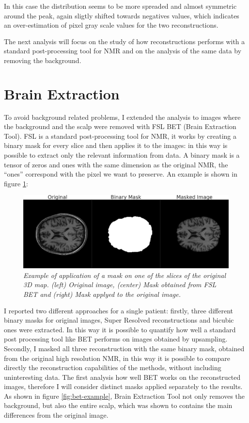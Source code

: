 \documentclass[12pt,a4paper]{report}
\begin{document}
In this case the distribution seems to be more spreaded and almost symmetric around the peak, again sligtly shifted towards negatives values, which indicates an over-estimation of pixel gray scale values for the two reconstructions. 

The next analysis will focus on the study of how reconstructions performs with a standard post-processing tool for NMR and on the analysis of the same data by removing the background. 

\section{Brain Extraction}

To avoid background related problems, I extended the analysis to images where the background and the scalp were removed with FSL BET (Brain Extraction Tool)\cite{fsl}.
FSL is a standard post-processing tool for NMR, it works by creating a binary mask for every slice and then applies it to the images: in this way is possible to extract only the relevant information from data. 
A binary mask is a tensor of zeros and ones with the same dimension as the original NMR, the ``ones'' correspond with the pixel we want to preserve. 
An example is shown in figure \ref{fig:mask-ex}:

\begin{figure}[H]
  \centering
  \includegraphics[scale=0.28]{./images/mask_example.png}
  \caption{\it Example of application of a mask on one of the slices of the original 3D map. (left) Original image, (center) Mask obtained from FSL BET and (right) Mask applyed to the original image. }
  \label{fig:mask-ex}
\end{figure}

I reported two different approaches for a single patient: firstly, three different binary masks for original images, Super Resolved reconstructions and bicubic ones were extracted. In this way it is possible to quantify how well a standard post processing tool like BET performs on images obtained by upsampling. 
Secondly, I masked all three reconstruction with the same binary mask, obtained from the original high resolution NMR, in this way it is possible to compare directly the reconstruction capabilities of the methods, without including uninteresting data.
The first analysis how well BET works on the reconstructed images, therefore I will consider distinct masks applied separately to the results.
As shown in figure \ref{fig:bet-example}, Brain Extraction Tool not only removes the background, but also the entire scalp, which was shown to contains the main differences from the original image.
\end{document}
